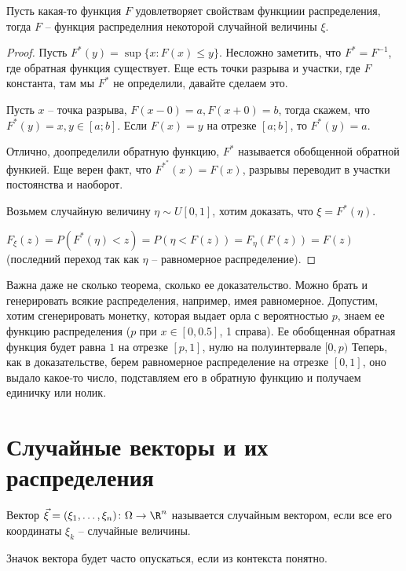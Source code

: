 \begin{theorem}

    Пусть какая-то функция $F$ удовлетворяет свойствам функциии распределения, тогда $F$ -- функция распределния некоторой случайной величины $\xi$.
\end{theorem}
\begin{proof}
    Пусть $F^*(y) = \sup \{x\colon F(x) \leq y\}$.
    Несложно заметить, что $F^* = F^{-1}$, где обратная функция существует. 
    Еще есть точки разрыва и участки, где $F$ константа, там мы $F^*$ не определили, давайте сделаем это.

    Пусть $x$ -- точка разрыва, $F(x-0) = a, F(x+0) = b$, тогда скажем, что $F^*(y) = x, y \in [a; b]$.
    Если $F(x) = y$ на отрезке $[a; b]$, то $F^*(y) = a$.

    Отлично, доопределили обратную функцию, $F^*$ называется обобщенной обратной функией.
    Еще верен факт, что $F^{*^*}(x) = F(x)$, разрывы переводит в участки постоянства и наоборот.

    Возьмем  случайную величину $\eta \sim U[0, 1]$, хотим доказать, что $\xi = F^*(\eta)$.

    $F_{\xi}(z) = P(F^*(\eta) < z) = P(\eta < F(z)) = F_{\eta}(F(z)) = F(z)$ (последний переход так как $\eta$ -- равномерное распределение).
\end{proof}
\begin{Rem}
Важна даже не сколько теорема, сколько ее доказательство. Можно брать и генерировать всякие распределения, например, имея равномерное.
Допустим, хотим сгенерировать монетку, которая выдает орла с вероятностью $p$, знаем ее функцию распределения ($p$ при $x \in [0, 0.5]$, 1 справа).
Ее обобщенная обратная функция будет равна $1$ на отрезке $[p, 1]$, нулю на полуинтервале $[0, p)$
Теперь, как в доказательстве, берем равномерное распределение на отрезке $[0, 1]$, оно выдало какое-то число, подставляем его в обратную функцию и получаем единичку или нолик.
\end{Rem}


\section{Случайные векторы и их распределения}

\begin{Def}
Вектор $\vec{\xi} = (\xi_1, \dots, \xi_n) \colon \Omega \to \R^n$ называется случайным вектором, если все его координаты $\xi_k$ -- случайные величины.
\end{Def}                                                                                                                                        
\begin{Rem}
Значок вектора будет часто опускаться, если из контекста понятно.
\end{Rem}

